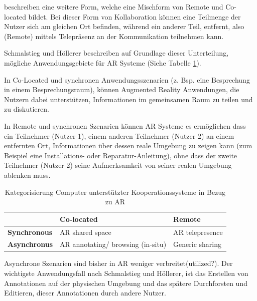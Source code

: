 \cite[S.~188]{ElSayedNevenA.M.BruceH.ThomasRossT.Smith2015} beschreiben eine weitere Form, welche eine Mischform von Remote und Co-located bildet. 
Bei dieser Form von Kollaboration können eine Teilmenge der Nutzer sich am gleichen Ort befinden, während ein anderer Teil, entfernt, 
also (Remote) mittels Telepräsenz an der Kommunikation teilnehmen kann. 

Schmalstieg und Höllerer \cite{DieterSchmalstieg2016} beschreiben auf Grundlage dieser Unterteilung, mögliche 
Anwendungsgebiete für AR Systeme (Siehe Tabelle \ref{tab:categorycscw}).

\cite{DieterSchmalstieg2016} In Co-Located und synchronen Anwendungsszenarien (z. Bsp. eine Besprechung in einem Besprechungsraum), können 
Augmented Reality Anwendungen, die Nutzern dabei unterstützen, Informationen im gemeinsamen Raum zu teilen und zu diskutieren. 

In Remote und synchronen Szenarien können AR Systeme es ermöglichen dass ein Teilnehmer (Nutzer 1), einem anderen 
Teilnehmer (Nutzer 2) an einem entfernten Ort, Informationen über dessen reale Umgebung zu zeigen 
kann (zum Beispiel eine Installations- oder Reparatur-Anleitung), ohne dass der zweite Teilnehmer (Nutzer 2) seine 
Aufmerksamkeit von seiner realen Umgebung ablenken muss.

\begin{table}[htbp]
\caption{Kategorisierung Computer unterstützter Kooperationssysteme in Bezug zu AR}
	\begin{center}
		\begin{tabular}{|l|ll|}
		\hline
		 & \textbf{Co-located} & \textbf{Remote}\\
		\hline
		\textbf{Synchronous} &  AR shared space & AR telepresence \\
		\textbf{Asynchronus} & AR annotating/ browsing (in-situ) & Generic sharing\\
		\hline
		\end{tabular}
	\end{center}
	\label{tab:categorycscw}
\end{table}

\cite[S.~362]{DieterSchmalstieg2016} Asynchrone Szenarien sind bisher in AR weniger verbreitet(utilized?). Der wichtigste Anwendungsfall nach Schmalstieg und Höllerer, 
ist das Erstellen von Annotationen auf der physischen Umgebung und das spätere Durchforsten und Editieren, dieser Annotationen durch andere Nutzer. 

